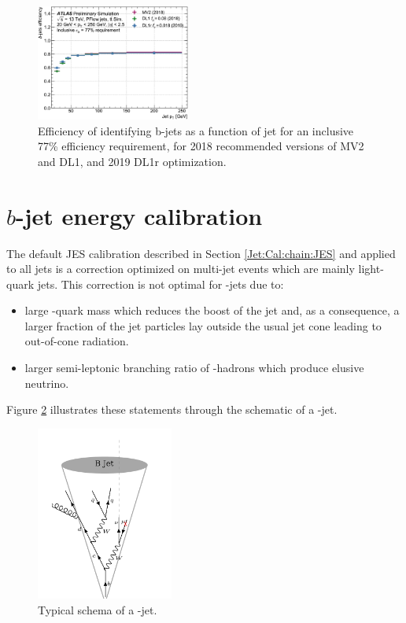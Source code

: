 \begin{figure}[htbp]
    \centering
    \includegraphics[width=0.45\textwidth]{Ch4/Img/b_jet_Eff_77.png}
    \caption{Efficiency of identifying b-jets as a function of jet \pT for an inclusive 77\% efficiency requirement, for 2018 recommended versions of MV2 and DL1, and 2019 DL1r optimization.}
    \label{fig:Jet:Tag:Dlr:Eff_77}
\end{figure}

\section{$b$-jet energy calibration}
\label{Jet:Cal:BCal}
The default JES calibration described in Section \ref{Jet:Cal:chain:JES} and applied to all jets is a correction optimized on multi-jet events which are mainly light-quark jets. This correction is not optimal for \bq-jets due to:
\begin{itemize}
    \item large \bq-quark mass which reduces the boost of the jet and, as a consequence, a larger fraction of the jet particles lay outside the usual jet cone leading to out-of-cone radiation.
    \item larger semi-leptonic branching ratio of \bq-hadrons which produce elusive neutrino.
\end{itemize}
Figure \ref{fig:Jet:Cal:BCal:bJet} illustrates these statements through the schematic of a \bq-jet. 
\begin{figure}[htbp]
    \centering
    \includegraphics[width=0.4\textwidth]{Ch4/Img/b-jet.png}
    \begin{tcolorbox}[colback=black!5!white,colframe=white!75!black]
    \caption{Typical schema of a \bq-jet.}
    \label{fig:Jet:Cal:BCal:bJet}
    \end{tcolorbox}
\end{figure}

